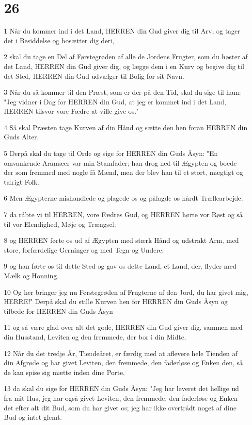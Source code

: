 \chapter{26}

\par 1 Når du kommer ind i det Land, HERREN din Gud giver dig til Arv, og tager det i Besiddelse og bosætter dig deri,
\par 2 skal du tage en Del af Førstegrøden af alle de Jordens Frugter, som du høster af det Land, HERREN din Gud giver dig, og lægge dem i en Kurv og begive dig til det Sted, HERREN din Gud udvælger til Bolig for sit Navn.
\par 3 Når du så kommer til den Præst, som er der på den Tid, skal du sige til ham: "Jeg vidner i Dag for HERREN din Gud, at jeg er kommet ind i det Land, HERREN tilsvor vore Fædre at ville give os."
\par 4 Så skal Præsten tage Kurven af din Hånd og sætte den hen foran HERREN din Guds Alter.
\par 5 Derpå skal du tage til Orde og sige for HERREN din Guds Åsyn: "En omvankende Aramæer var min Stamfader; han drog ned til Ægypten og boede der som fremmed med nogle få Mænd, men der blev han til et stort, mægtigt og talrigt Folk.
\par 6 Men Ægypterne mishandlede og plagede os og pålagde os hårdt Trællearbejde;
\par 7 da råbte vi til HERREN, vore Fædres Gud, og HERREN hørte vor Røst og så til vor Elendighed, Møje og Trængsel;
\par 8 og HERREN førte os ud af Ægypten med stærk Hånd og udstrakt Arm, med store, forfærdelige Gerninger og med Tegn og Undere;
\par 9 og han førte os til dette Sted og gav os dette Land, et Land, der, flyder med Mælk og Honning.
\par 10 Og her bringer jeg nu Førstegrøden af Frugterne af den Jord, du har givet mig, HERRE!" Derpå skal du stille Kurven hen for HERREN din Guds Åsyn og tilbede for HERREN din Guds Åsyn
\par 11 og så være glad over alt det gode, HERREN din Gud giver dig, sammen med din Husstand, Leviten og den fremmede, der bor i din Midte.
\par 12 Når du det tredje År, Tiendeåret, er færdig med at aflevere hele Tienden af din Afgrøde og har givet Leviten, den fremmede, den faderløse og Enken den, så de kan spise sig mætte inden dine Porte,
\par 13 da skal du sige for HERREN din Guds Åsyn: "Jeg har leveret det hellige ud fra mit Hus, jeg har også givet Leviten, den fremmede, den faderløse og Enken det efter alt dit Bud, som du har givet os; jeg har ikke overtrådt noget af dine Bud og intet glemt.
